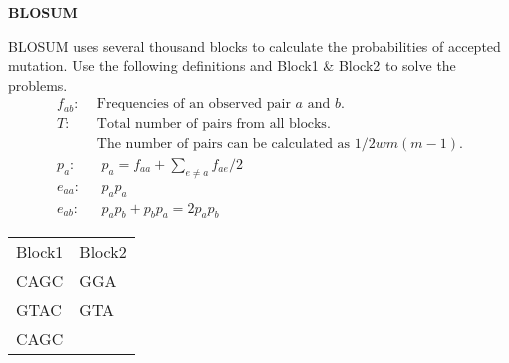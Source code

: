 \question \textbf{BLOSUM}

BLOSUM uses several thousand blocks to calculate the probabilities of accepted mutation. Use the following definitions and Block1 \& Block2 to solve the problems.
\begin{align*}
f_{ab}:& \text{ Frequencies of an observed pair } a \text{ and } b. \\
T:& \text{ Total number of pairs from all blocks. } \\
 & \text{ The number of pairs can be calculated as } 1/2wm(m-1). \\
p_a:& \text{ } p_a = f_{aa} + \sum_{e \neq a} f_{ae}/2 \\
e_{aa}:&  \text{ } p_a p_a \\
e_{ab}:&  \text{ } p_a p_b + p_b p_a = 2 p_a p_b
\end{align*}
\begin{table}[H]
\centering
\begin{tabular}{ll}
Block1 & Block2 \\
CAGC   & GGA    \\
GTAC   & GTA    \\
CAGC   &       
\end{tabular}
\end{table}

